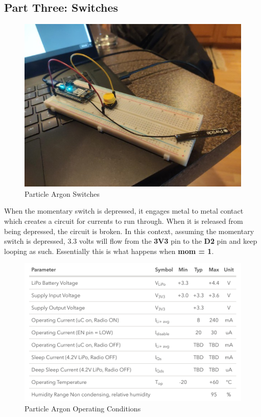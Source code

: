 \documentclass{article}
\begin{document}
\subsection{Part Three: Switches}
\begin{figure}[H]
\center
\includegraphics[width=\textwidth]{images/switches.jpeg}
\caption{Particle Argon Switches}
\label{fig:switches}
\end{figure}

When the momentary switch is depressed, it engages metal to metal contact which creates a circuit for currents to run through. When it is released from being depressed, the circuit is broken. In this context, assuming the momentary switch is depressed, 3.3 volts will flow from the \textbf{3V3} pin to the \textbf{D2} pin and keep looping as such. Essentially this is what happens when \textbf{mom = 1}.\\

\begin{figure}[H]
\center
\includegraphics[width=\textwidth]{images/operating-conditions.png}
\caption{Particle Argon Operating Conditions}
\label{fig:operating}
\end{figure}
\end{document}
